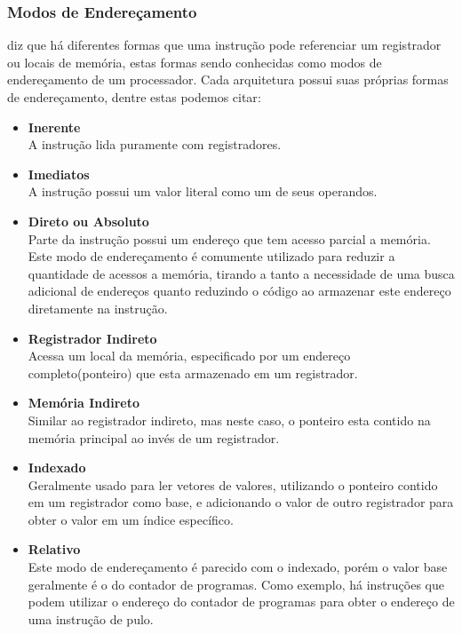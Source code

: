 \documentclass[
	12pt,				%
	openright,			%
	oneside,			%
	a4paper,			%
	english,			%
	french,				%
	spanish,			%
	brazil,				%
	]{abntex2}
\begin{document}
\subsubsection{Modos de Endereçamento}
 diz que há diferentes formas que uma instrução pode referenciar um registrador ou locais de memória, estas formas sendo conhecidas como modos de endereçamento de um processador. Cada arquitetura possui suas próprias formas de endereçamento, dentre estas podemos citar\cite[p.75]{patterson_computer_1996}\cite{catsoulis_designing_2002}:
\begin{itemize}
    \item \textbf{Inerente}\\
    A instrução lida puramente com registradores.
    \item \textbf{Imediatos}\\
    A instrução possui um valor literal como um de seus operandos.
    \item \textbf{Direto ou Absoluto}\\
    Parte da instrução possui um endereço que tem acesso parcial a memória. Este modo de endereçamento é comumente utilizado para reduzir a quantidade de acessos a memória, tirando a tanto a necessidade de uma busca adicional de endereços quanto reduzindo o código ao armazenar este endereço diretamente na instrução.
    \item \textbf{Registrador Indireto}\\
    Acessa um local da memória, especificado por um endereço completo(ponteiro) que esta armazenado em um registrador.
    \item \textbf{Memória Indireto}\\
    Similar ao registrador indireto, mas neste caso, o ponteiro esta contido na memória principal ao invés de um registrador.
    \item  \textbf{Indexado}\\
    Geralmente usado para ler vetores de valores, utilizando o ponteiro contido em um registrador como base, e adicionando o valor de outro registrador para obter o valor em um índice específico.
    \item \textbf{Relativo}\\
    Este modo de endereçamento é parecido com o indexado, porém o valor base geralmente é o do contador de programas. Como exemplo, há instruções que podem utilizar o endereço do contador de programas para obter o endereço de uma instrução de pulo.

\end{itemize}
\end{document}
